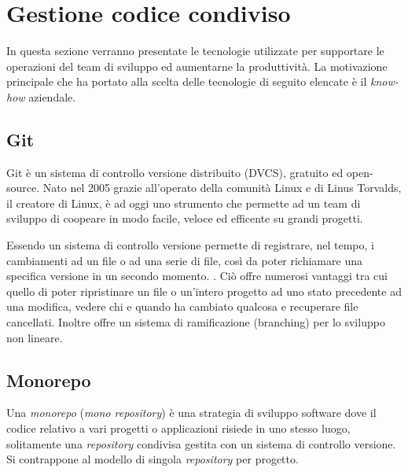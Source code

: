 \section{Gestione codice condiviso}
In questa sezione verranno presentate le tecnologie utilizzate per supportare le operazioni
del team di sviluppo ed aumentarne la produttività.
La motivazione principale che ha portato alla scelta delle tecnologie di seguito elencate è il \textit{know-how} aziendale.

\subsection{Git}
Git \cite{Git} è un sistema di controllo versione distribuito (DVCS), gratuito ed open-source.
Nato nel 2005 grazie all'operato della comunità Linux e di Linus Torvalds, il creatore di Linux, è ad oggi uno strumento che
permette ad un team di sviluppo di coopeare in modo facile, veloce ed efficente su grandi progetti.

Essendo un sistema di controllo versione permette di registrare, nel tempo, i cambiamenti ad un file o ad una serie di file,
così da poter richiamare una specifica versione in un secondo momento. \cite{GitPro}.
Ciò offre numerosi vantaggi tra cui quello di poter ripristinare un file o un'intero progetto ad uno stato precedente ad una modifica,
vedere chi e quando ha cambiato qualcosa e recuperare file cancellati.
Inoltre offre un sistema di ramificazione (branching) per lo sviluppo non lineare.


\subsection{Monorepo}
Una \textit{monorepo}\cite{Google-Monorepo} (\textit{mono repository}) è una strategia di sviluppo software dove il codice
relativo a vari progetti o applicazioni risiede in uno stesso luogo, solitamente una \textit{repository} condivisa
gestita con un sistema di controllo versione.
Si contrappone al modello di singola \textit{repository} per progetto.


